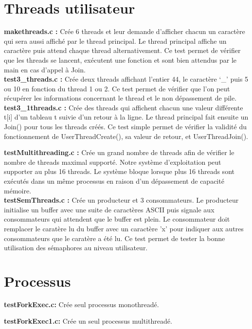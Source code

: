 \documentclass[12pt]{report}
\begin{document}
\section{Threads utilisateur}

\textbf{makethreads.c :}
Crée 6 threads et leur demande d’afficher chacun un caractère qui sera aussi affiché par le thread principal. Le thread principal
affiche un caractère puis attend chaque thread alternativement. Ce test permet de vérifier que les
threads se lancent, exécutent une fonction et sont bien attendus par le main en cas d'appel à Join.\\

\textbf{test3\_threads.c :} Crée deux threads affichant l’entier 44, le caractère ‘\_’ puis 5 ou 10 en
fonction du thread 1 ou 2. Ce test permet de vérifier que l’on peut récupérer les informations
concernant le thread et le non dépassement de pile.\\

\textbf{test3\_1threads.c :} Crée des threads qui affichent chacun une valeur différente t[i] d’un
tableau t suivie d’un retour à la ligne. Le thread principal fait ensuite un Join() pour tous les threads
créés. Ce test simple permet de vérifier la validité du fonctionnement de UserThreadCreate(), sa
valeur de retour, et UserThreadJoin().
\newpage

\textbf{testMultithreading.c :} Crée un grand nombre de threads afin de vérifier le nombre de threads maximal supporté. Notre système d'exploitation peut supporter au plus 16 threads. Le système bloque lorsque plus 16 threads sont exécutés dans un même processus en raison d'un dépassement de capacité mémoire.\\

\textbf{testSemThreads.c :} Crée un producteur et 3 consommateurs. Le producteur initialise un buffer avec une suite de caractères ASCII puis signale aux consommateurs qui attendent que le buffer est plein. Le consommateur doit remplacer le caratère lu du buffer avec un caractère 'x' pour indiquer aux autres consommateurs que le caratère a été lu. Ce test permet de tester la bonne utilisation des sémaphores au niveau utilisateur.
\bigskip

\section{Processus}

\textbf{testForkExec.c:} Crée seul processus monothreadé.
\bigskip

\textbf{testForkExec1.c:} Crée un seul processus multithreadé.
\bigskip
\end{document}

